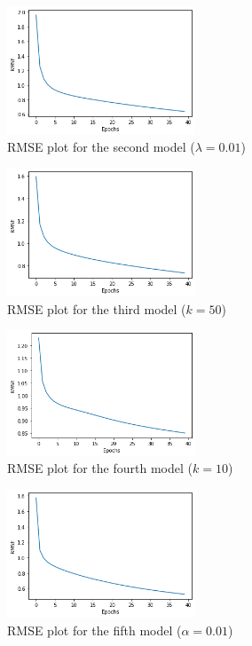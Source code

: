 \documentclass[final]{cvpr}
\begin{document}
\begin{figure}
	\caption{RMSE plot for the second model ($\lambda=0.01$)}
	\includegraphics[width=0.5\textwidth]{./svd2.png}
\end{figure}

\begin{figure}
	\caption{RMSE plot for the third model ($k=50$)}
	\includegraphics[width=0.5\textwidth]{./svd3.png}
\end{figure}

\begin{figure}
	\caption{RMSE plot for the fourth model ($k=10$)}
	\includegraphics[width=0.5\textwidth]{./svd4.png}
\end{figure}

\begin{figure}
	\caption{RMSE plot for the fifth model ($\alpha=0.01$)}
	\includegraphics[width=0.5\textwidth]{./svd5.png}
\end{figure}
\end{document}
